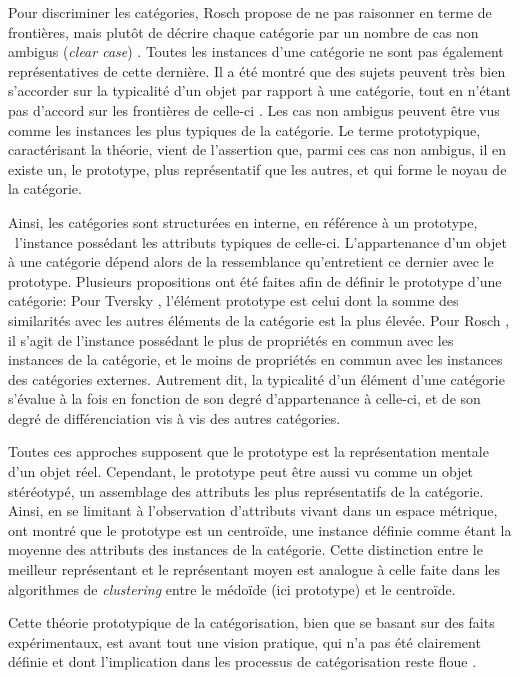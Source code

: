 Pour discriminer les catégories, Rosch propose de ne pas raisonner en terme de frontières, mais plutôt de décrire chaque catégorie par un nombre de cas non ambigus (\emph{clear case}) \citep[p. 36]{rosch1978cognition}. Toutes les instances d'une catégorie ne sont pas également représentatives de cette dernière. Il a été montré que des sujets peuvent très bien s'accorder sur la typicalité d'un objet par rapport à une catégorie, tout en n'étant pas d'accord sur les frontières de celle-ci \citep{rosch1974human,rosch1975cognitive}. Les cas non ambigus peuvent être vus comme les instances les plus typiques de la catégorie. Le terme prototypique, caractérisant la théorie, vient de l'assertion que, parmi ces cas non ambigus, il en existe un, le prototype, plus représentatif que les autres, et qui forme le noyau de la catégorie.

Ainsi, les catégories sont structurées en interne, en référence à un prototype, \ie~l'instance possédant les attributs typiques de celle-ci. L'appartenance d'un objet à une catégorie dépend alors de la ressemblance qu'entretient ce dernier avec le prototype. Plusieurs propositions ont été faites afin de définir le prototype d'une catégorie: Pour Tversky \citep{tversky1977features}, l'élément prototype est celui dont la somme des similarités avec les autres éléments de la catégorie est la plus élevée. Pour Rosch \citep{rosch1975family}, il s'agit de l'instance possédant le plus de propriétés en commun avec les instances de la catégorie, et le moins de propriétés en commun avec les instances des catégories externes. Autrement dit, la typicalité d'un élément d'une catégorie s'évalue à la fois en fonction de son degré d'appartenance à celle-ci, et de son degré de différenciation vis à vis des autres catégories.

Toutes ces approches supposent que le prototype est la représentation mentale d'un objet réel. Cependant, le prototype peut être aussi vu comme un objet stéréotypé, un assemblage des attributs les plus représentatifs de la catégorie. Ainsi, en se limitant à l'observation d'attributs vivant dans un espace métrique, \citep{reed1972pattern, rosch1976structural} ont montré que le prototype est un centroïde, une instance définie comme étant la moyenne des attributs des instances de la catégorie. Cette distinction entre le meilleur représentant et le représentant moyen est analogue à celle faite dans les algorithmes de \emph{clustering} entre le médoïde (ici prototype) et le centroïde.

Cette théorie prototypique de la catégorisation, bien que se basant sur des faits expérimentaux, est avant tout une vision pratique, qui n'a pas été clairement définie et dont l'implication dans les processus de catégorisation reste floue \citep[p. 36-40]{rosch1978cognition} \citep[p. 49-54]{dubois1991semantique}.


